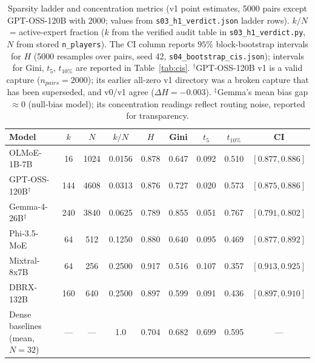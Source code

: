 \documentclass[sigconf]{acmart}
\begin{document}
\begin{table}[t]
\centering\small
\begin{tabular}{lcccccccc}
\toprule
Model & $k$ & $N$ & $k/N$ & $H$ & Gini & $t_5$ & $t_{10\%}$ & CI \\
\midrule
OLMoE-1B-7B          & 16  & 1024 & 0.0156 & 0.878 & 0.647 & 0.092 & 0.510 & $[0.877,0.886]$ \\
GPT-OSS-120B$^{\dagger}$ & 144 & 4608 & 0.0313 & 0.876 & 0.727 & 0.020 & 0.573 & $[0.875,0.886]$ \\
Gemma-4-26B$^{\ddagger}$ & 240 & 3840 & 0.0625 & 0.789 & 0.855 & 0.051 & 0.767 & $[0.791,0.802]$ \\
Phi-3.5-MoE         & 64  & 512  & 0.1250 & 0.880 & 0.640 & 0.095 & 0.469 & $[0.877,0.892]$ \\
Mixtral-8x7B        & 64  & 256  & 0.2500 & 0.917 & 0.516 & 0.107 & 0.357 & $[0.913,0.925]$ \\
DBRX-132B           & 160 & 640  & 0.2500 & 0.897 & 0.599 & 0.091 & 0.436 & $[0.897,0.910]$ \\
\midrule
Dense baselines (mean, $N{=}32$) & --- & --- & 1.0 & 0.704 & 0.682 & 0.699 & 0.595 & --- \\
\bottomrule
\end{tabular}
\caption{Sparsity ladder and concentration metrics (v1 point estimates,
5000 pairs except GPT-OSS-120B with 2000; values from
\texttt{s03\_h1\_verdict.json} ladder rows). $k/N$ = active-expert fraction
($k$ from the verified audit table in \texttt{s03\_h1\_verdict.py}, $N$ from
stored \texttt{n\_players}). The CI column reports $95\%$ block-bootstrap
intervals for $H$ (5000 resamples over pairs, seed 42,
\texttt{s04\_bootstrap\_cis.json}); intervals for Gini, $t_5$, $t_{10\%}$
are reported in Table~\ref{tab:cis}. $^{\dagger}$GPT-OSS-120B v1 is a valid
capture ($n_{pairs}=2000$); its earlier all-zero v1 directory was a broken
capture that has been superseded, and v0/v1 agree ($\Delta H = -0.003$).
$^{\ddagger}$Gemma's mean bias gap $\approx 0$ (null-bias model); its
concentration readings reflect routing noise, reported for transparency.}
\label{tab:ladder}
\end{table}
\end{document}
